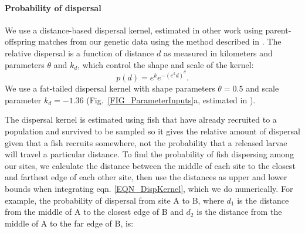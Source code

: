\documentclass[12pt, oneside]{article}   	%
\begin{document}

\paragraph*{Probability of dispersal}

We use a distance-based dispersal kernel, estimated in other work using parent-offspring matches from our genetic data \citep{catalanoInPrepconnectivity} using the method described in \cite{bode2018estimating}. The relative dispersal is a function of distance $d$ as measured in kilometers and parameters $\theta$ and $k_d$, which control the shape and scale of the kernel:
\begin{equation}
p(d) = e^k e^{-(e^k d)^\theta}. \label{EQN_DispKernel}
\end{equation}
We use a fat-tailed dispersal kernel with shape parameters $\theta = 0.5$ and scale parameter $k_d = -1.36$ (Fig.\ \ref{FIG_ParameterInputs}a, estimated in \citep{catalanoInPrepconnectivity}).

The dispersal kernel is estimated using fish that have already recruited to a population and survived to be sampled so it gives the relative amount of dispersal given that a fish recruits somewhere, not the probability that a released larvae will travel a particular distance. To find the probability of fish dispersing among our sites, we calculate the distance between the middle of each site to the closest and farthest edge of each other site, then use the distances as upper and lower bounds when integrating eqn. \ref{EQN_DispKernel}, which we do numerically. For example, the probability of dispersal from site A to B, where $d_1$ is the distance from the middle of A to the closest edge of B and $d_2$ is the distance from the middle of A to the far edge of B, is:

\end{document}
